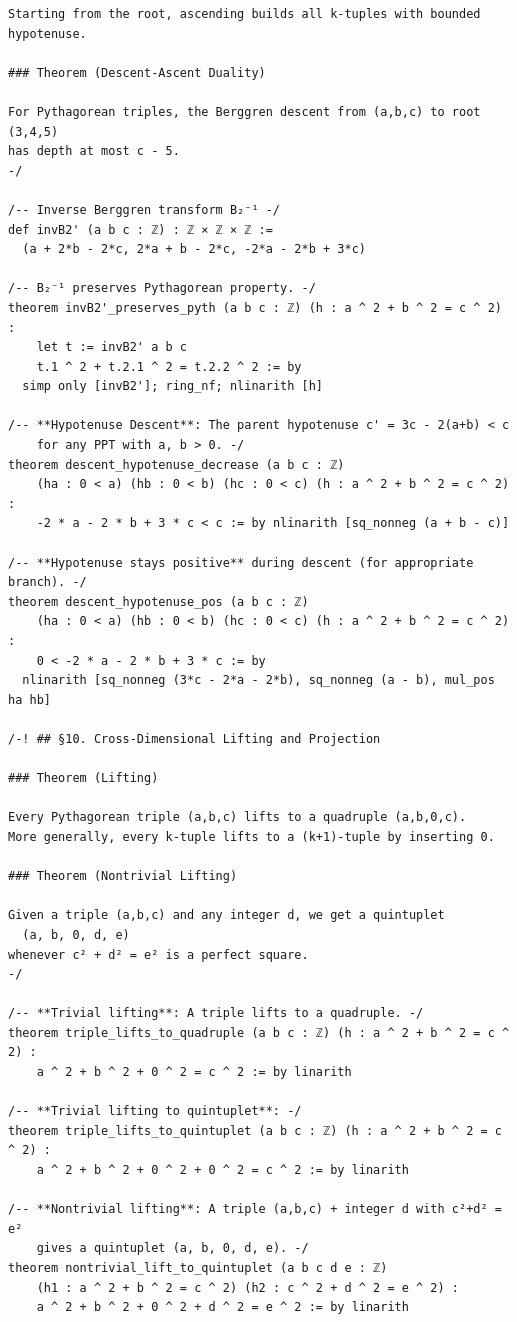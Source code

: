 \documentclass[11pt,openany]{book}
\theoremstyle{definition}
\theoremstyle{plain}
\theoremstyle{remark}
\begin{document}
\begin{lstlisting}[style=lean]
Starting from the root, ascending builds all k-tuples with bounded hypotenuse.

### Theorem (Descent-Ascent Duality)

For Pythagorean triples, the Berggren descent from (a,b,c) to root (3,4,5)
has depth at most c - 5.
-/

/-- Inverse Berggren transform B₂⁻¹ -/
def invB2' (a b c : ℤ) : ℤ × ℤ × ℤ :=
  (a + 2*b - 2*c, 2*a + b - 2*c, -2*a - 2*b + 3*c)

/-- B₂⁻¹ preserves Pythagorean property. -/
theorem invB2'_preserves_pyth (a b c : ℤ) (h : a ^ 2 + b ^ 2 = c ^ 2) :
    let t := invB2' a b c
    t.1 ^ 2 + t.2.1 ^ 2 = t.2.2 ^ 2 := by
  simp only [invB2']; ring_nf; nlinarith [h]

/-- **Hypotenuse Descent**: The parent hypotenuse c' = 3c - 2(a+b) < c
    for any PPT with a, b > 0. -/
theorem descent_hypotenuse_decrease (a b c : ℤ)
    (ha : 0 < a) (hb : 0 < b) (hc : 0 < c) (h : a ^ 2 + b ^ 2 = c ^ 2) :
    -2 * a - 2 * b + 3 * c < c := by nlinarith [sq_nonneg (a + b - c)]

/-- **Hypotenuse stays positive** during descent (for appropriate branch). -/
theorem descent_hypotenuse_pos (a b c : ℤ)
    (ha : 0 < a) (hb : 0 < b) (hc : 0 < c) (h : a ^ 2 + b ^ 2 = c ^ 2) :
    0 < -2 * a - 2 * b + 3 * c := by
  nlinarith [sq_nonneg (3*c - 2*a - 2*b), sq_nonneg (a - b), mul_pos ha hb]

/-! ## §10. Cross-Dimensional Lifting and Projection

### Theorem (Lifting)

Every Pythagorean triple (a,b,c) lifts to a quadruple (a,b,0,c).
More generally, every k-tuple lifts to a (k+1)-tuple by inserting 0.

### Theorem (Nontrivial Lifting)

Given a triple (a,b,c) and any integer d, we get a quintuplet
  (a, b, 0, d, e)
whenever c² + d² = e² is a perfect square.
-/

/-- **Trivial lifting**: A triple lifts to a quadruple. -/
theorem triple_lifts_to_quadruple (a b c : ℤ) (h : a ^ 2 + b ^ 2 = c ^ 2) :
    a ^ 2 + b ^ 2 + 0 ^ 2 = c ^ 2 := by linarith

/-- **Trivial lifting to quintuplet**: -/
theorem triple_lifts_to_quintuplet (a b c : ℤ) (h : a ^ 2 + b ^ 2 = c ^ 2) :
    a ^ 2 + b ^ 2 + 0 ^ 2 + 0 ^ 2 = c ^ 2 := by linarith

/-- **Nontrivial lifting**: A triple (a,b,c) + integer d with c²+d² = e²
    gives a quintuplet (a, b, 0, d, e). -/
theorem nontrivial_lift_to_quintuplet (a b c d e : ℤ)
    (h1 : a ^ 2 + b ^ 2 = c ^ 2) (h2 : c ^ 2 + d ^ 2 = e ^ 2) :
    a ^ 2 + b ^ 2 + 0 ^ 2 + d ^ 2 = e ^ 2 := by linarith


\end{lstlisting}
\end{document}
